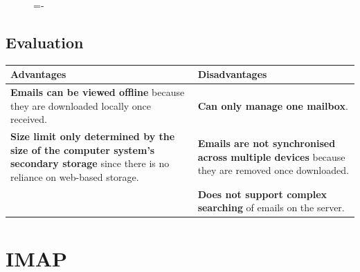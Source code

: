 \documentclass[a4paper]{systems-software}
\begin{document}
\begin{figure}[H]
	\lineskip=-\fboxrule
\end{figure}


\subsection*{Evaluation}

\begin{longtabu} to \textwidth {| X[1,l] | X[1,l] |}
	\hline
	\textbf{Advantages} & \textbf{Disadvantages}
	\\ \hline
	\textbf{Emails can be viewed offline} because they are downloaded locally once received. &
	\textbf{Can only manage one mailbox}.
	\\ \hline
	\textbf{Size limit only determined by the size of the computer system’s secondary storage} since there is no reliance on web-based storage. & \textbf{Emails are not synchronised across multiple devices} because they are removed once downloaded.
	\\ \hline
	& \textbf{Does not support complex searching} of emails on the server.
	\\ \hline
\end{longtabu}


\section*{IMAP}
\end{document}
